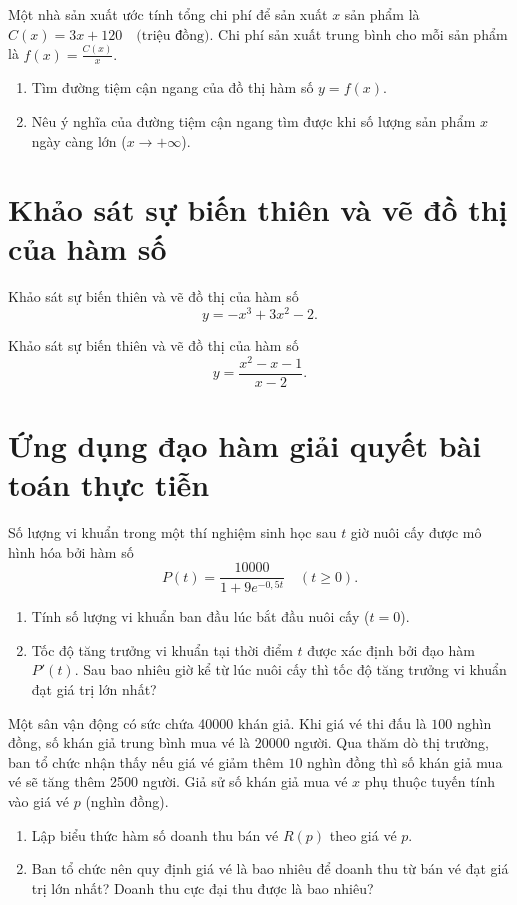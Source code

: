 \exercise Một nhà sản xuất ước tính tổng chi phí để sản xuất $x$ sản phẩm là
$C(x) = 3x + 120\quad \text{(triệu đồng)}.$
Chi phí sản xuất trung bình cho mỗi sản phẩm là
$f(x) = \frac{C(x)}{x}.$ 
\begin{enumerate}
   \item Tìm đường tiệm cận ngang của đồ thị hàm số $y = f(x)$.
   \item Nêu ý nghĩa của đường tiệm cận ngang tìm được khi số lượng sản phẩm $x$ ngày càng lớn ($x \to +\infty$).
\end{enumerate}

\section{Khảo sát sự biến thiên và vẽ đồ thị của hàm số}

\exercise Khảo sát sự biến thiên và vẽ đồ thị của hàm số
$$y = -x^3 + 3x^2 - 2.$$

\exercise Khảo sát sự biến thiên và vẽ đồ thị của hàm số
$$y = \frac{x^2 - x - 1}{x - 2}.$$ 

\section{Ứng dụng đạo hàm giải quyết bài toán thực tiễn}

\exercise Số lượng vi khuẩn trong một thí nghiệm sinh học sau $t$ giờ nuôi cấy được mô hình hóa bởi hàm số
$$P(t) = \frac{10000}{1 + 9e^{-0,5t}} \quad (t \ge 0).$$
\begin{enumerate}
   \item Tính số lượng vi khuẩn ban đầu lúc bắt đầu nuôi cấy ($t = 0$).
   \item Tốc độ tăng trưởng vi khuẩn tại thời điểm $t$ được xác định bởi đạo hàm $P'(t)$. Sau bao nhiêu giờ kể từ lúc nuôi cấy thì tốc độ tăng trưởng vi khuẩn đạt giá trị lớn nhất?
\end{enumerate}

\exercise Một sân vận động có sức chứa \num{40000} khán giả. Khi giá vé thi đấu là $100$ nghìn đồng, số khán giả trung bình mua vé là \num{20000} người. Qua thăm dò thị trường, ban tổ chức nhận thấy nếu giá vé giảm thêm $10$ nghìn đồng thì số khán giả mua vé sẽ tăng thêm \num{2500} người. Giả sử số khán giả mua vé $x$ phụ thuộc tuyến tính vào giá vé $p$ (nghìn đồng).
\begin{enumerate}
   \item Lập biểu thức hàm số doanh thu bán vé $R(p)$ theo giá vé $p$.
   \item Ban tổ chức nên quy định giá vé là bao nhiêu để doanh thu từ bán vé đạt giá trị lớn nhất? Doanh thu cực đại thu được là bao nhiêu?
\end{enumerate}

